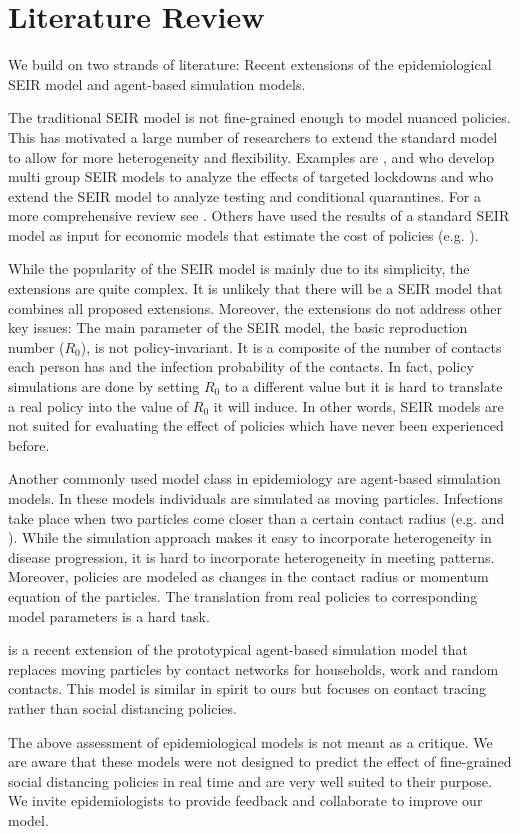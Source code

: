 \section{Literature Review}
\label{sec:literature_review}

We build on two strands of literature: Recent extensions of the epidemiological SEIR
model and agent-based simulation models.

The traditional SEIR model is not fine-grained enough to model nuanced policies. This
has motivated a large number of researchers to extend the standard model to allow for
more heterogeneity and flexibility. Examples are \citet{Grimm2020},
\citet{Donsimoni2020} and \citet{Acemoglu2020} who develop multi group SEIR models to
analyze the effects of targeted lockdowns and \citet{Berger2020} who extend the SEIR
model to analyze testing and conditional quarantines. For a more comprehensive review
see \citet{Avery2020}. Others have used the results of a standard SEIR model as input
for economic models that estimate the cost of policies (e.g. \citet{Dorn2020}).

While the popularity of the SEIR model is mainly due to its simplicity, the extensions
are quite complex. It is unlikely that there will be a SEIR model that combines all
proposed extensions. Moreover, the extensions do not address other key issues: The main
parameter of the SEIR model, the basic reproduction number ($R_0$), is not
policy-invariant. It is a composite of the number of contacts each person has and the
infection probability of the contacts. In fact, policy simulations are done by setting
$R_0$ to a different value but it is hard to translate a real policy into the value of
$R_0$ it will induce. In other words, SEIR models are not suited for evaluating the
effect of policies which have never been experienced before.

Another commonly used model class in epidemiology are agent-based simulation models. In
these models individuals are simulated as moving particles. Infections take place when
two particles come closer than a certain contact radius (e.g. \citet{Silva2020} and
\citet{Cuevas2020}). While the simulation approach makes it easy to incorporate
heterogeneity in disease progression, it is hard to incorporate heterogeneity in meeting
patterns. Moreover, policies are modeled as changes in the contact radius or momentum
equation of the particles. The translation from real policies to corresponding model
parameters is a hard task.

\citet{Hinch2020} is a recent extension of the prototypical agent-based simulation model
that replaces moving particles by contact networks for households, work and random
contacts. This model is similar in spirit to ours but focuses on contact tracing rather
than social distancing policies.

The above assessment of epidemiological models is not meant as a critique. We are aware
that these models were not designed to predict the effect of fine-grained social
distancing policies in real time and are very well suited to their purpose. We invite
epidemiologists to provide feedback and collaborate to improve our model.

